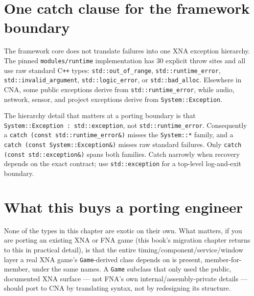 \section{One catch clause for the framework boundary}

The framework core does not translate failures into one XNA exception hierarchy. The pinned
\texttt{modules/runtime} implementation has 30 explicit throw sites and all use raw standard
C\texttt{++} types: \texttt{std::out\_of\_range}, \texttt{std::runtime\_error},
\texttt{std::invalid\_argument}, \texttt{std::logic\_error}, or \texttt{std::bad\_alloc}.
Elsewhere in CNA, some public exceptions derive from \texttt{std::runtime\_error}, while audio,
network, sensor, and project exceptions derive from \texttt{System::Exception}.

The hierarchy detail that matters at a porting boundary is that
\texttt{System::Exception : std::exception}, not \texttt{std::runtime\_error}. Consequently a
\texttt{catch (const std::runtime\_error\&)} misses the \texttt{System::*} family, and a
\texttt{catch (const System::Exception\&)} misses raw standard failures. Only
\texttt{catch (const std::exception\&)} spans both families. Catch narrowly when recovery depends
on the exact contract; use \texttt{std::exception} for a top-level log-and-exit boundary.

\section{What this buys a porting engineer}

None of the types in this chapter are exotic on their own. What matters, if you are porting
an existing XNA or FNA game (this book's migration chapter returns to this in practical
detail), is that the entire timing/component/service/window layer a real XNA game's
\texttt{Game}-derived class depends on is present, member-for-member, under the same names.
A \texttt{Game} subclass that only used the public, documented XNA surface --- not FNA's own
internal/assembly-private details --- should port to CNA by translating syntax, not by
redesigning its structure.
